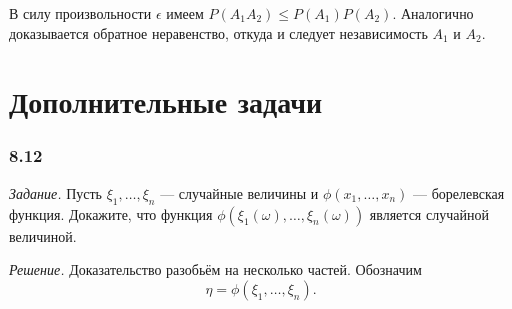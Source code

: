 В силу произвольности $ \epsilon $ имеем $P \left( A_1 A_2 \right) \leq P \left( A_1 \right) P \left( A_2 \right) $.
Аналогично доказывается обратное неравенство, откуда и следует независимость $A_1$ и $A_2$.

\section*{Дополнительные задачи}

\subsubsection*{8.12}

\textit{Задание.} Пусть $ \xi_1, \dotsc, \xi_n $ --- случайные величины и $ \phi \left( x_1, \dotsc, x_n \right) $ --- борелевская функция.
Докажите, что функция $ \phi \left( \xi_1 \left( \omega \right), \dotsc, \xi_n \left( \omega \right) \right) $ является случайной величиной.

\textit{Решение.} Доказательство разобьём на несколько частей.
Обозначим
$$ \eta = \phi \left( \xi_1, \dotsc, \xi_n \right).$$

